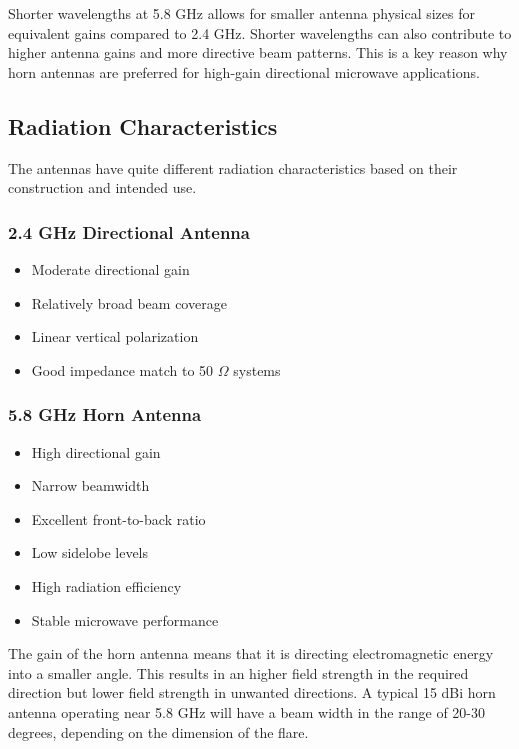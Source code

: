 \documentclass[12pt,a4paper]{report}
\begin{document}
	Shorter wavelengths at 5.8 GHz allows for smaller antenna physical sizes for equivalent gains compared to 2.4 GHz. Shorter wavelengths can also contribute to higher antenna gains and more directive beam patterns. This is a key reason why horn antennas are preferred for high-gain directional microwave applications.
	\subsection{Radiation Characteristics}
	The antennas have quite different radiation characteristics based on their construction and intended use.
	
	\subsubsection{2.4 GHz Directional Antenna}
	
	\begin{itemize}
		\item Moderate directional gain
		\item Relatively broad beam coverage
		\item Linear vertical polarization
		\item Good impedance match to 50 $\Omega$ systems
	\end{itemize}
	
	\subsubsection{5.8 GHz Horn Antenna}
	
	\begin{itemize}
		\item High directional gain
		\item Narrow beamwidth
		\item Excellent front-to-back ratio
		\item Low sidelobe levels
		\item High radiation efficiency
		\item Stable microwave performance
	\end{itemize}
	The gain of the horn antenna means that it is directing electromagnetic energy into a smaller angle. This results in an higher field strength in the required direction but lower field strength in unwanted directions. A typical 15 dBi horn antenna operating near 5.8 GHz will have a beam width in the range of 20-30 degrees, depending on the dimension of the flare.
\end{document}
